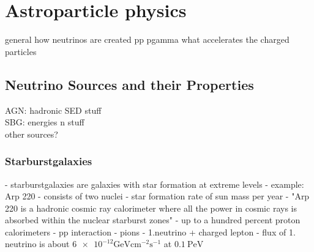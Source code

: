 \chapter{Astroparticle physics} \label{sec:astro}

general how neutrinos are created pp pgamma
what accelerates the charged particles


\section{Neutrino Sources and their Properties}

AGN: hadronic SED stuff\\
SBG: energies n stuff\\
other sources?

\subsection{Starburstgalaxies}
- starburstgalaxies are galaxies with star formation at extreme levels
- example: Arp 220
- consists of two nuclei
- star formation rate of  sun mass per year
- "Arp 220 is a hadronic cosmic ray calorimeter where all the power in cosmic rays is absorbed within the nuclear starburst zones"
- up to a hundred percent proton calorimeters
- pp interaction -\> pions -\> 1.neutrino + charged lepton
- flux of 1. neutrino is about $\num{6e-12}\si{\giga\electronvolt\centi\meter\tothe{-2}\second\tothe{-1}}$ at $\SI{0.1}{\peta\electronvolt}$
